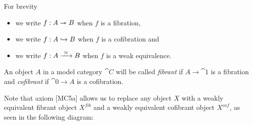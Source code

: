 \begin{notation} For brevity
	\begin{itemize}
		\item we write $f: A \twoheadrightarrow B$ when $f$ is a fibration,
		\item we write $f: A \hookrightarrow B$ when $f$ is a cofibration and
		\item we write $f: A \xrightarrow{\,\,{\simeq}\,\,} B$ when $f$ is a weak equivalence.
	\end{itemize}
\end{notation}

\begin{definition}
	An object $A$ in a model category $\cat{C}$ will be called \emph{fibrant} if $A \to \cat{1}$ is a fibration and \emph{cofibrant} if $\cat{0} \to A$ is a cofibration.
\end{definition}

Note that axiom [MC5a] allows us to replace any object $X$ with a weakly equivalent fibrant object $X^{fib}$ and a weakly equivalent cofibrant object $X^{cof}$, as seen in the following diagram:

\begin{center}
\quad
{}
\end{center}

